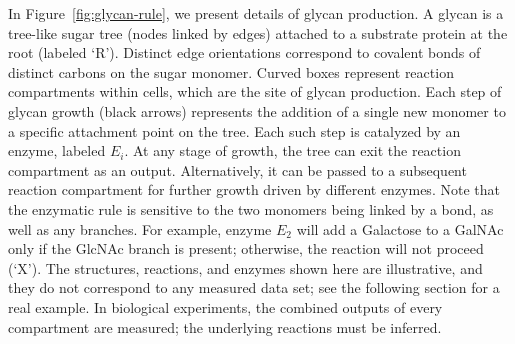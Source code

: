 In Figure~\ref{fig:glycan-rule}, we present details of glycan production. A glycan is a tree-like sugar tree (nodes linked by edges) attached to a substrate protein at the root (labeled `R'). Distinct edge orientations correspond to covalent bonds of distinct carbons on the sugar monomer. Curved boxes represent reaction compartments within cells, which are the site of glycan production. Each step of glycan growth (black arrows) represents the addition of a single new monomer to a specific attachment point on the tree. Each such step is catalyzed by an enzyme, labeled $E_i$. At any stage of growth, the tree can exit the reaction compartment as an output. Alternatively, it can be passed to a subsequent reaction compartment for further growth driven by different enzymes. Note that the enzymatic rule is sensitive to the two monomers being linked by a bond, as well as any branches. For example, enzyme $E_2$ will add a Galactose to a GalNAc only if the GlcNAc branch is present; otherwise, the reaction will not proceed (`X'). The structures, reactions, and enzymes shown here are illustrative, and they do not correspond to any measured data set; see the following section for a real example. In biological experiments, the combined outputs of every compartment are measured; the underlying reactions must be inferred.

%

%

